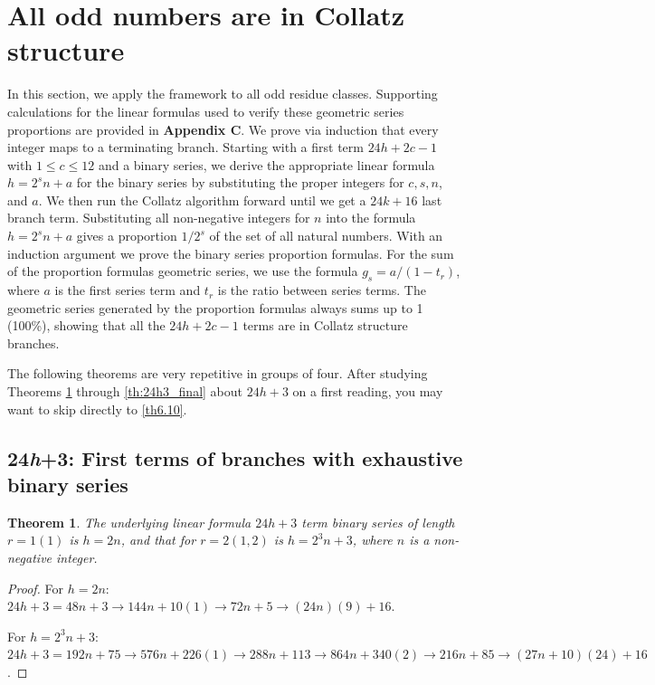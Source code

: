 \documentclass[sn-mathphys-num, pdflatex]{sn-jnl}
\newtheorem{theorem}{Theorem}[section]
\begin{document}
\section{All odd numbers are in Collatz structure}\label{sec6}
In this section, we apply the framework to all odd residue classes. Supporting calculations for the linear formulas used to verify these geometric series proportions are provided in \textbf{Appendix C}. We prove via induction that every integer maps to a terminating branch. Starting with a first term $24h+2c-1$ with $1 \le c \le 12$ and a binary series, we derive the appropriate linear formula $h = 2^sn+a$ for the binary series by substituting the proper integers for $c, s, n$, and $a$. We then run the Collatz algorithm forward until we get a $24k+16$ last branch term. Substituting all non-negative integers for $n$ into the formula $h = 2^sn+a$ gives a proportion $1/2^s$ of the set of all natural numbers. With an induction argument we prove the binary series proportion formulas. For the sum of the proportion formulas geometric series, we use the formula $g_s = a / (1 - t_r)$, where $a$ is the first series term and $t_r$ is the ratio between series terms. The geometric series generated by the proportion formulas always sums up to 1 (100\%), showing that all the $24h+2c-1$ terms are in Collatz structure branches.

The following theorems are very repetitive in groups of four. After studying Theorems \ref{th:24h3_base} through \ref{th:24h3_final} about $24h+3$ on a first reading, you may want to skip directly to \ref{th6.10}.

\subsection{24\textit{h}+3: First terms of branches with exhaustive binary series}\label{sec6.1}
\begin{theorem}\label{th:24h3_base}
    The underlying linear formula $24h+3$ term binary series of length $r=1 (1)$ is $h=2n$, and that for $r =2 (1, 2)$ is $h=2^3n+3$, where $n$ is a non-negative integer.
\end{theorem}

\begin{proof}
    For $h=2n$:
    $24h+3 = 48n+3 \to 144n+10(1) \to 72n+5 \to (24n)(9)+16$.
    
    For $h=2^3n+3$:
    $24h+3 = 192n+75 \to 576n+226(1) \to 288n+113 \to 864n+340(2) \to 216n+85 \to (27n+10)(24)+16$.
\end{proof}
\end{document}
